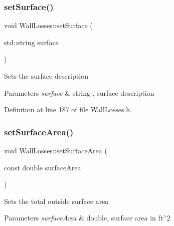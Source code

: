 \mbox{\label{class_wall_losses_af329a27b78e1f2d84af6a48ffc59bfad}} 
\subsubsection{\texorpdfstring{set\+Surface()}{setSurface()}\hspace{0.1cm}{\footnotesize\ttfamily [3/3]}}
{\footnotesize\ttfamily void Wall\+Losses\+::set\+Surface (\begin{DoxyParamCaption}\item[{std\+::string}]{surface }\end{DoxyParamCaption})\hspace{0.3cm}{\ttfamily [inline]}}

Sets the surface description 
\begin{DoxyParams}{Parameters}
{\em surface} & string , surface description \\
\hline
\end{DoxyParams}


Definition at line 187 of file Wall\+Losses.\+h.

\mbox{\label{class_wall_losses_acbbbe4b1ec44bb04e5e1db944017995c}} 
\subsubsection{\texorpdfstring{set\+Surface\+Area()}{setSurfaceArea()}\hspace{0.1cm}{\footnotesize\ttfamily [1/3]}}
{\footnotesize\ttfamily void Wall\+Losses\+::set\+Surface\+Area (\begin{DoxyParamCaption}\item[{const double}]{surface\+Area }\end{DoxyParamCaption})\hspace{0.3cm}{\ttfamily [inline]}}

Sets the total outside surface area 
\begin{DoxyParams}{Parameters}
{\em surface\+Area} & double, surface area in ft$^\wedge$2 \\
\hline
\end{DoxyParams}


